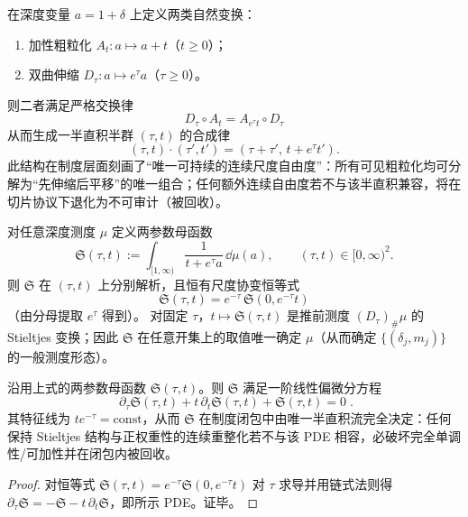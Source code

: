 \begin{proposition}
在深度变量 \(a=1+\delta\) 上定义两类自然变换：
\begin{enumerate}
  \item 加性粗粒化 \(A_t:a\mapsto a+t\)（\(t\ge0\)）；
  \item 双曲伸缩 \(D_\tau:a\mapsto e^{\tau}a\)（\(\tau\ge0\)）。
\end{enumerate}
则二者满足严格交换律
\[
\boxed{\;
D_\tau\circ A_t=A_{e^{\tau}t}\circ D_\tau\;}
\]
从而生成一半直积半群 \((\tau,t)\) 的合成律
\[
(\tau,t)\cdot(\tau',t')=(\tau+\tau',\,t+e^{\tau}t').
\]
此结构在制度层面刻画了“唯一可持续的连续尺度自由度”：所有可见粗粒化均可分解为“先伸缩后平移”的唯一组合；任何额外连续自由度若不与该半直积兼容，将在切片协议下退化为不可审计（被回收）。
\end{proposition}

\begin{proposition}
对任意深度测度 \(\mu\) 定义两参数母函数
\[
\mathfrak{S}(\tau,t):=\int_{[1,\infty)}\frac{1}{t+e^\tau a}\,\dd\mu(a),
\qquad (\tau,t)\in[0,\infty)^2.
\]
则 \(\mathfrak{S}\) 在 \((\tau,t)\) 上分别解析，且恒有尺度协变恒等式
\[
\boxed{\;
\mathfrak{S}(\tau,t)=e^{-\tau}\,\mathfrak{S}\!\left(0,e^{-\tau}t\right)\;}
\]
（由分母提取 \(e^\tau\) 得到）。
对固定 \(\tau\)，\(t\mapsto\mathfrak{S}(\tau,t)\) 是推前测度 \((D_\tau)_\#\mu\) 的 Stieltjes 变换；因此 \(\mathfrak{S}\) 在任意开集上的取值唯一确定 \(\mu\)（从而确定 \(\{(\delta_j,m_j)\}\) 的一般测度形态）。
\end{proposition}

\begin{proposition}\label{prop:xi-stieltjes-semidir-pde}
沿用上式的两参数母函数 \(\mathfrak{S}(\tau,t)\)。则 \(\mathfrak{S}\) 满足一阶线性偏微分方程
\[
\boxed{\;
\partial_\tau \mathfrak{S}(\tau,t)+t\,\partial_t \mathfrak{S}(\tau,t)+\mathfrak{S}(\tau,t)=0\; }.
\]
其特征线为 \(t e^{-\tau}=\mathrm{const}\)，从而 \(\mathfrak{S}\) 在制度闭包中由唯一半直积流完全决定：任何保持 Stieltjes 结构与正权重性的连续重整化若不与该 PDE 相容，必破坏完全单调性/可加性并在闭包内被回收。
\end{proposition}
\begin{proof}
对恒等式 \(\mathfrak{S}(\tau,t)=e^{-\tau}\mathfrak{S}(0,e^{-\tau}t)\) 对 \(\tau\) 求导并用链式法则得
\(
\partial_\tau \mathfrak{S}=-\mathfrak{S}-t\,\partial_t \mathfrak{S}
\)，即所示 PDE。证毕。
\end{proof}

